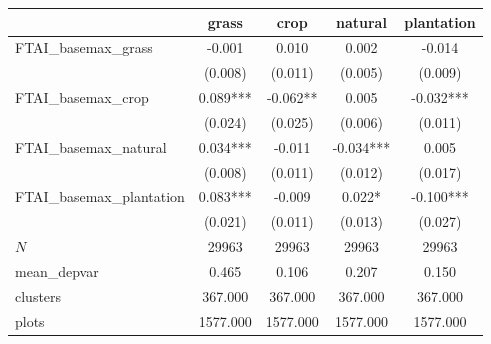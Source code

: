 {
\def\sym#1{\ifmmode^{#1}\else\(^{#1}\)\fi}
\begin{tabular}{l*{4}{c}}
\toprule
          &\multicolumn{1}{c}{grass}&\multicolumn{1}{c}{crop}&\multicolumn{1}{c}{natural}&\multicolumn{1}{c}{plantation}\\
\midrule
FTAI\_basemax\_grass&   -0.001   &    0.010   &    0.002   &   -0.014   \\
          &  (0.008)   &  (0.011)   &  (0.005)   &  (0.009)   \\
\addlinespace
FTAI\_basemax\_crop&    0.089***&   -0.062** &    0.005   &   -0.032***\\
          &  (0.024)   &  (0.025)   &  (0.006)   &  (0.011)   \\
\addlinespace
FTAI\_basemax\_natural&    0.034***&   -0.011   &   -0.034***&    0.005   \\
          &  (0.008)   &  (0.011)   &  (0.012)   &  (0.017)   \\
\addlinespace
FTAI\_basemax\_plantation&    0.083***&   -0.009   &    0.022*  &   -0.100***\\
          &  (0.021)   &  (0.011)   &  (0.013)   &  (0.027)   \\
\midrule
\(N\)     &    29963   &    29963   &    29963   &    29963   \\
mean\_depvar&    0.465   &    0.106   &    0.207   &    0.150   \\
clusters  &  367.000   &  367.000   &  367.000   &  367.000   \\
plots     & 1577.000   & 1577.000   & 1577.000   & 1577.000   \\
\bottomrule
\end{tabular}
}
